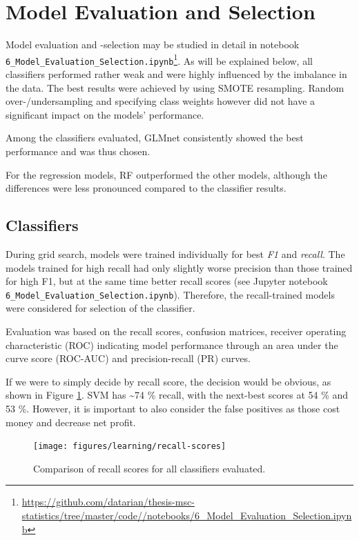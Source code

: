 \documentclass[
  11pt,
  a4paper,
  DIV=12,captions=tableheading,oneside,titlepage]{scrbook}
\begin{document}
\hypertarget{results-models}{%
\section{Model Evaluation and Selection}\label{results-models}}

Model evaluation and -selection may be studied in detail in notebook \texttt{6\_Model\_Evaluation\_Selection.ipynb}\footnote{\url{https://github.com/datarian/thesis-msc-statistics/tree/master/code//notebooks/6_Model_Evaluation_Selection.ipynb}}. As will be explained below, all classifiers performed rather weak and were highly influenced by the imbalance in the data. The best results were achieved by using SMOTE resampling. Random over-/undersampling and specifying class weights however did not have a significant impact on the models' performance.

Among the classifiers evaluated, GLMnet consistently showed the best performance and was thus chosen.

For the regression models, RF outperformed the other models, although the differences were less pronounced compared to the classifier results.

\hypertarget{classifiers-1}{%
\subsection{Classifiers}\label{classifiers-1}}

During grid search, models were trained individually for best \emph{F1} and \emph{recall}. The models trained for high recall had only slightly worse precision than those trained for high F1, but at the same time better recall scores (see Jupyter notebook \texttt{6\_Model\_Evaluation\_Selection.ipynb}). Therefore, the recall-trained models were considered for selection of the classifier.

Evaluation was based on the recall scores, confusion matrices, receiver operating characteristic (ROC) indicating model performance through an area under the curve score (ROC-AUC) and precision-recall (PR) curves.

If we were to simply decide by recall score, the decision would be obvious, as shown in Figure \ref{fig:recall-scores}. SVM has \textasciitilde{}74 \% recall, with the next-best scores at 54 \% and 53 \%. However, it is important to also consider the false positives as those cost money and decrease net profit.



\begin{figure}

{\centering \texttt{[image: figures/learning/recall-scores]} 

}

\caption{Comparison of recall scores for all classifiers evaluated.}\label{fig:recall-scores}
\end{figure}
\end{document}
